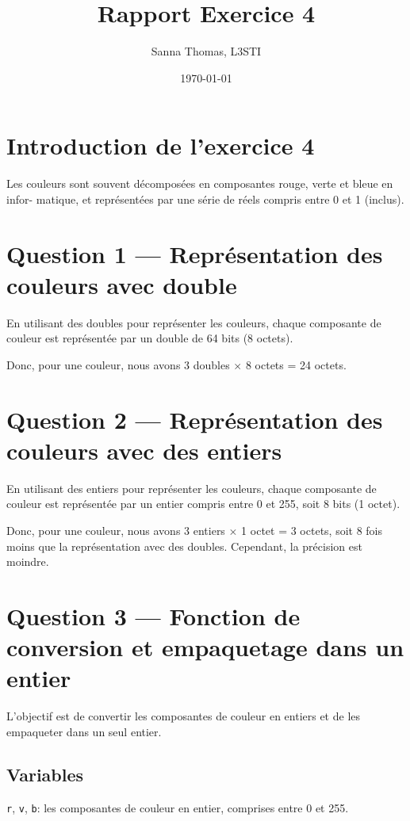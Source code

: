 \documentclass{article}
\title{Rapport Exercice 4}
\author{Sanna Thomas, L3STI}
\date{\today}
\begin{document}
\maketitle

\section*{Introduction de l'exercice 4}

Les couleurs sont souvent décomposées en composantes rouge, verte et bleue en infor-
matique, et représentées par une série de réels compris entre 0 et 1 (inclus).

\section*{Question 1 --- Représentation des couleurs avec double}

En utilisant des doubles pour représenter les couleurs, chaque composante de couleur est représentée par un double de 64 bits (8 octets).

Donc, pour une couleur, nous avons 3 doubles $\times$ 8 octets = 24 octets.

\section*{Question 2 --- Représentation des couleurs avec des entiers}

En utilisant des entiers pour représenter les couleurs, chaque composante de couleur est représentée par un entier compris entre 0 et 255, soit 8 bits (1 octet).

Donc, pour une couleur, nous avons 3 entiers $\times$ 1 octet = 3 octets, soit 8 fois moins que la représentation avec des doubles. Cependant, la précision est moindre.

\section*{Question 3 --- Fonction de conversion et empaquetage dans un entier}

L'objectif est de convertir les composantes de couleur en entiers et de les empaqueter dans un seul entier.

\subsection*{Variables}

\texttt{r}, \texttt{v}, \texttt{b}: les composantes de couleur en entier, comprises entre 0 et 255.
\end{document}
